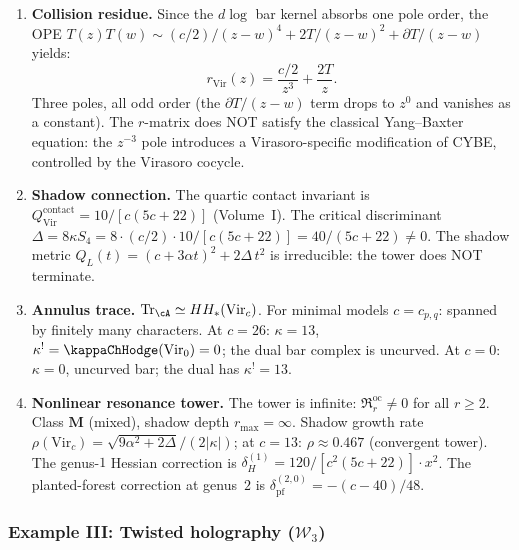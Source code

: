 \begin{computation}
\begin{enumerate}[label=\textup{(\roman*)},nosep]
\item \textbf{Collision residue.}
 Since the $d\log$ bar kernel absorbs one pole order,
 the OPE $T(z)T(w) \sim (c/2)/(z-w)^4 + 2T/(z-w)^2 + \partial T/(z-w)$
 yields:
 \begin{equation}\label{eq:platonic-r-Vir}
 r_{\mathrm{Vir}}(z)
 = \frac{c/2}{z^3} + \frac{2T}{z}.
 \end{equation}
 Three poles, all odd order (the $\partial T/(z-w)$ term drops
 to $z^0$ and vanishes as a constant). The $r$-matrix does NOT
 satisfy the classical Yang--Baxter equation: the $z^{-3}$ pole
 introduces a Virasoro-specific modification of CYBE, controlled
 by the Virasoro cocycle.

\item \textbf{Shadow connection.}
 The quartic contact invariant is
 $Q^{\mathrm{contact}}_{\mathrm{Vir}} = 10/[c(5c+22)]$
 \textup{(}Volume~I\textup{)}.
 The critical discriminant
 $\Delta = 8\kappa S_4 = 8 \cdot (c/2) \cdot 10/[c(5c+22)]
 = 40/(5c+22) \ne 0$.
 The shadow metric $Q_L(t) = (c + 3\alpha t)^2 + 2\Delta\, t^2$
 is irreducible: the tower does NOT terminate.

\item \textbf{Annulus trace.}
 $\mathrm{Tr}_\cA \simeq HH_*(\mathrm{Vir}_c)$.
 For minimal models $c = c_{p,q}$:
 spanned by finitely many characters.
 At $c = 26$: $\kappa = 13$, $\kappa^! = \kappaChHodge(\mathrm{Vir}_0) = 0$;
 the dual bar complex is uncurved.
 At $c = 0$: $\kappa = 0$, uncurved bar; the dual has $\kappa^! = 13$.

\item \textbf{Nonlinear resonance tower.}
 The tower is infinite: $\mathfrak{R}^{\mathrm{oc}}_r \ne 0$
 for all $r \ge 2$.
 Class $\mathbf{M}$ (mixed), shadow depth $r_{\max} = \infty$.
 Shadow growth rate $\rho(\mathrm{Vir}_c) =
 \sqrt{9\alpha^2 + 2\Delta}/(2|\kappa|)$;
 at $c = 13$: $\rho \approx 0.467$ (convergent tower).
 The genus-$1$ Hessian correction is
 $\delta_H^{(1)} = 120/[c^2(5c+22)] \cdot x^2$.
 The planted-forest correction at genus~$2$ is
 $\delta_{\mathrm{pf}}^{(2,0)} = -(c - 40)/48$.
\end{enumerate}
\end{computation}


\subsubsection{Example III: Twisted holography (\texorpdfstring{$\mathcal{W}_3$}{W\_3})}
\label{subsubsec:platonic-W3}

